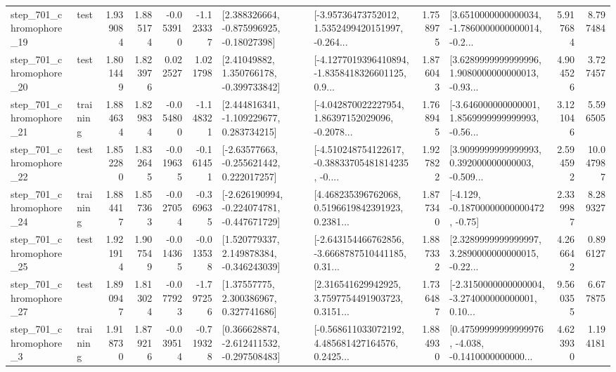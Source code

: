 \begin{tabular}{llrrrrllrlrr}
  step\_701\_chromophore\_19 &      test &      1.939084 &    1.885174 &     -0.053910 & -1.123337 &    [2.388326664, -0.875996925, -0.18027398] &  [-3.95736473752012, 1.5352499420151997, -0.264... &       1.758975 &  [3.6510000000000034, -1.7860000000000014, -0.2... &            5.917684 &          8.797484 \\
  step\_701\_chromophore\_20 &      test &      1.801449 &    1.823976 &      0.022527 &  1.021798 &     [2.41049882, 1.350766178, -0.399733842] &  [-4.1277019396410894, -1.8358418326601125, 0.9... &       1.876043 &  [3.6289999999999996, 1.9080000000000013, -0.93... &            4.904526 &          3.727457 \\
  step\_701\_chromophore\_21 &  training &      1.884634 &    1.829834 &     -0.054800 & -1.148321 &    [2.444816341, -1.109229677, 0.283734215] &  [-4.042870022227954, 1.86397152029096, -0.2078... &       1.768945 &  [-3.646000000000001, 1.8569999999999993, -0.56... &            3.121046 &          5.596505 \\
  step\_701\_chromophore\_22 &      test &      1.852280 &    1.832645 &     -0.019635 & -0.161451 &    [-2.63577663, -0.255621442, 0.222017257] &  [-4.510248754122617, -0.38833705481814235, -0.... &       1.927822 &  [3.9099999999999993, 0.392000000000003, -0.509... &            2.594592 &         10.047987 \\
  step\_701\_chromophore\_24 &  training &      1.884417 &    1.857363 &     -0.027054 & -0.369635 &  [-2.626190994, -0.224074781, -0.447671729] &  [4.468235396762068, 0.5196619842391923, 0.2381... &       1.877340 &              [-4.129, -0.18700000000000472, -0.75] &            2.339987 &          8.289327 \\
  step\_701\_chromophore\_25 &      test &      1.921914 &    1.907549 &     -0.014365 & -0.013538 &    [1.520779337, 2.149878384, -0.346243039] &  [-2.643154466762856, -3.6668787510441185, 0.31... &       1.887332 &  [2.3289999999999997, 3.2890000000000015, -0.22... &            4.266642 &          0.896127 \\
  step\_701\_chromophore\_27 &      test &      1.890947 &    1.813024 &     -0.077923 & -1.797256 &      [1.37557775, 2.300386967, 0.327741686] &  [2.316541629942925, 3.7597754491903723, 0.3151... &       1.736487 &  [-2.3150000000000004, -3.274000000000001, 0.10... &            9.560355 &          6.677875 \\
   step\_701\_chromophore\_3 &  training &      1.918730 &    1.879216 &     -0.039514 & -0.719328 &   [0.366628874, -2.612411532, -0.297508483] &  [-0.568611033072192, 4.485681427164576, 0.2425... &       1.884930 &  [0.47599999999999976, -4.038, -0.1410000000000... &            4.623930 &          1.194181 \\

\end{tabular}
